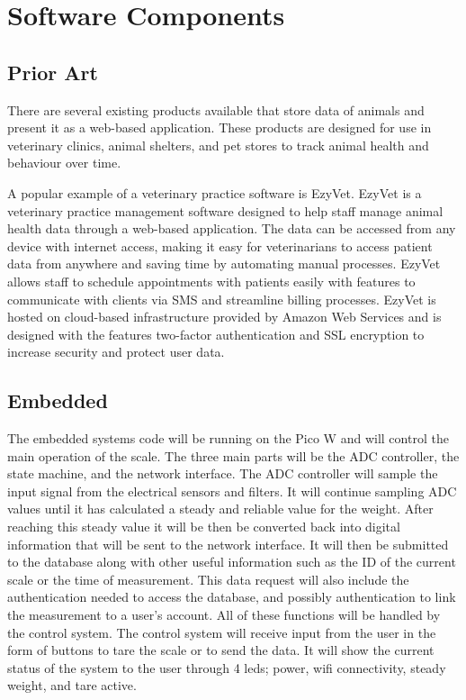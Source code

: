 
\chapter{Software Components}

\section{Prior Art}
There are several existing products available that store data of animals and present it as a web-based application. These products are designed for use in veterinary clinics, animal shelters, and pet stores to track animal health and behaviour over time. 

A popular example of a veterinary practice software is EzyVet. EzyVet is a veterinary practice management software designed to help staff manage animal health data through a web-based application. The data can be accessed from any device with internet access, making it easy for veterinarians to access patient data from anywhere and saving time by automating manual processes. EzyVet allows staff to schedule appointments with patients easily with features to communicate with clients via SMS and streamline billing processes. EzyVet is hosted on cloud-based infrastructure provided by Amazon Web Services and is designed with the features two-factor authentication and SSL encryption to increase security and protect user data.

\section{Embedded}
The embedded systems code will be running on the Pico W and will control the main operation of the scale. The three main parts will be the ADC controller, the state machine, and the network interface.
The ADC controller will sample the input signal from the electrical sensors and filters. It will continue sampling ADC values until it has calculated a steady and reliable value for the weight.
After reaching this steady value it will be then be converted back into digital information that will be  sent to the network interface. It will then be submitted to the database along with other useful information such as the ID of the current scale or the time of measurement. This data request will also include the authentication needed to access the database, and possibly authentication to link the measurement to a user's account.
All of these functions will be handled by the control system. The control system will receive input from the user in the form of buttons to tare the scale or to send the data. It will show the current status of the system to the user through 4 leds; power, wifi connectivity, steady weight, and tare active.

